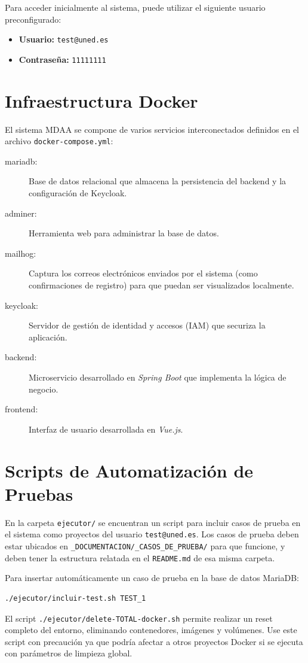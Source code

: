 Para acceder inicialmente al sistema, puede utilizar el siguiente usuario preconfigurado:
\begin{itemize}
    \item \textbf{Usuario:} \texttt{test@uned.es}
    \item \textbf{Contraseña:} \texttt{11111111}
\end{itemize}

\section{Infraestructura Docker}

El sistema MDAA se compone de varios servicios interconectados definidos en el archivo \texttt{docker-compose.yml}:

\begin{description}
    \item[mariadb:] Base de datos relacional que almacena la persistencia del backend y la configuración de Keycloak.
    \item[adminer:] Herramienta web para administrar la base de datos.
    \item[mailhog:] Captura los correos electrónicos enviados por el sistema (como confirmaciones de registro) para que puedan ser visualizados localmente.
    \item[keycloak:] Servidor de gestión de identidad y accesos (IAM) que securiza la aplicación.
    \item[backend:] Microservicio desarrollado en \textit{Spring Boot} que implementa la lógica de negocio.
    \item[frontend:] Interfaz de usuario desarrollada en \textit{Vue.js}.
\end{description}

\section{Scripts de Automatización de Pruebas}

En la carpeta \texttt{ejecutor/} se encuentran un script para incluir casos de prueba en el sistema como proyectos del usuario \texttt{test@uned.es}. Los casos de prueba deben estar ubicados en \texttt{\_DOCUMENTACION/\_CASOS\_DE\_PRUEBA/} para que funcione, y deben tener la estructura relatada en el \texttt{README.md} de esa misma carpeta.

Para insertar automáticamente un caso de prueba en la base de datos MariaDB:

\begin{lstlisting}[language=bash]
./ejecutor/incluir-test.sh TEST_1
\end{lstlisting}

\begin{tcolorbox}[colback=red!5,colframe=red!75!black,title=Nota sobre Reset Total]
El script \texttt{./ejecutor/delete-TOTAL-docker.sh} permite realizar un reset completo del entorno, eliminando contenedores, imágenes y volúmenes. Use este script con precaución ya que podría afectar a otros proyectos Docker si se ejecuta con parámetros de limpieza global.
\end{tcolorbox}
